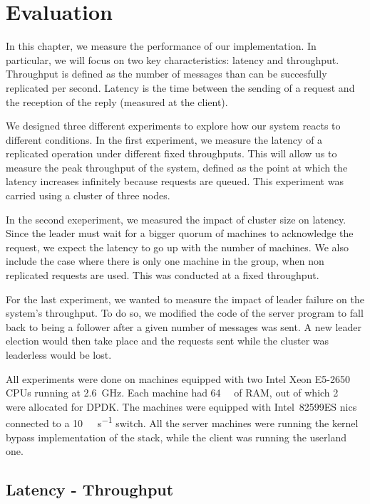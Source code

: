 \chapter{Evaluation}
\label{chap:evaluation}

In this chapter, we measure the performance of our implementation.
In particular, we will focus on two key characteristics: latency and throughput.
Throughput is defined as the number of messages than can be succesfully replicated per second.
Latency is the time between the sending of a request and the reception of the reply (measured at the client).

We designed three different experiments to explore how our system reacts to different conditions.
In the first experiment, we measure the latency of a replicated operation under different fixed throughputs.
This will allow us to measure the peak throughput of the system, defined as the point at which the latency increases infinitely because requests are queued.
This experiment was carried using a cluster of three nodes.

In the second exeperiment, we measured the impact of cluster size on latency.
Since the leader must wait for a bigger quorum of machines to acknowledge the request, we expect the latency to go up with the number of machines.
We also include the case where there is only one machine in the group, \ie when non replicated requests are used.
This was conducted at a fixed throughput.

For the last experiment, we wanted to measure the impact of leader failure on the system's throughput.
To do so, we modified the code of the server program to fall back to being a follower after a given number of messages was sent.
A new leader election would then take place and the requests sent while the cluster was leaderless would be lost.

All experiments were done on machines equipped with two Intel Xeon E5-2650 CPUs running at \SI{2.6}{\giga\hertz}.
Each machine had \SI{64}{\giga\byte} of RAM, out of which \SI{2}{\giga\byte} were allocated for DPDK.
The machines were equipped with Intel~82599ES \glspl{nic} connected to a \SI{10}{\giga\bit\per\second} switch.
All the server machines were running the kernel bypass implementation of the stack, while the client was running the userland one.

\section{Latency - Throughput}
\label{sec:latency_throughput}

